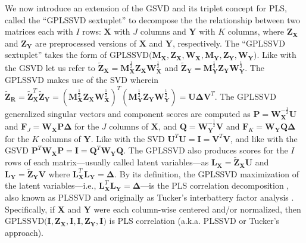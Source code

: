 \documentclass[12pt]{article}
\begin{document}
We now introduce an extension of the GSVD and its triplet concept for
PLS, called the ``GPLSSVD sextuplet'' to decompose the the relationship
between two matrices each with \(I\) rows: \({\mathbf X}\) with \(J\)
columns and \({\mathbf Y}\) with \(K\) columns, where
\({\mathbf Z}_{\mathbf X}\) and \({\mathbf Z}_{\mathbf Y}\) are
preprocessed versions of \({\mathbf X}\) and \({\mathbf Y}\),
respectively. The ``GPLSSVD sextuplet'' takes the form of
\(\mathrm{GPLSSVD(} {\mathbf M}_{\mathbf X}, {\mathbf Z}_{\mathbf X}, {\mathbf W}_{\mathbf X}, {\mathbf M}_{\mathbf Y}, {\mathbf Z}_{\mathbf Y}, {\mathbf W}_{\mathbf Y} \mathrm{)}\).
Like with the GSVD let us refer to
\(\widetilde{{\mathbf Z}}_{\mathbf X} = {\mathbf M}_{\mathbf X}^{\frac{1}{2}}{\mathbf Z}_{\mathbf X}{\mathbf W}_{\mathbf X}^{\frac{1}{2}}\)
and
\(\widetilde{{\mathbf Z}}_{\mathbf Y} = {\mathbf M}_{\mathbf Y}^{\frac{1}{2}}{\mathbf Z}_{\mathbf Y}{\mathbf W}_{\mathbf Y}^{\frac{1}{2}}\).
The GPLSSVD makes use of the SVD wherein
\(\widetilde{\mathbf Z}_{\mathbf R} = \widetilde{{\mathbf Z}}_{\mathbf X}^{T}\widetilde{{\mathbf Z}}_{\mathbf Y} = ({\mathbf M}_{\mathbf X}^{\frac{1}{2}}{\mathbf Z}_{\mathbf X}{\mathbf W}_{\mathbf X}^{\frac{1}{2}})^{T}({\mathbf M}_{\mathbf Y}^{\frac{1}{2}}{\mathbf Z}_{\mathbf Y}{\mathbf W}_{\mathbf Y}^{\frac{1}{2}}) = {\mathbf U} {\boldsymbol \Delta} {\mathbf V}^{T}\).
The GPLSSVD generalized singular vectors and component scores are
computed as
\({\mathbf P} = {\mathbf W}_{{\mathbf X}}^{-\frac{1}{2}}{\mathbf U}\)
and
\({\mathbf F}_{J} = {\mathbf W}_{{\mathbf X}}{\mathbf P}{\boldsymbol \Delta}\)
for the \(J\) columns of \({\mathbf X}\), and
\({\mathbf Q} = {\mathbf W}_{{\mathbf Y}}^{-\frac{1}{2}}{\mathbf V}\)
and
\({\mathbf F}_{K} = {\mathbf W}_{{\mathbf Y}}{\mathbf Q}{\boldsymbol \Delta}\)
for the \(K\) columns of \({\mathbf Y}\). Like with the SVD
\({\mathbf U}^{T}{\mathbf U} = {\mathbf I} = {\mathbf V}^{T}{\mathbf V}\),
and like with the GSVD
\({\mathbf P}^{T}{\mathbf W}_{\mathbf X}{\mathbf P} = {\mathbf I} = {\mathbf Q}^{T}{\mathbf W}_{\mathbf Y}{\mathbf Q}\).
The GPLSSVD also produces scores for the \(I\) rows of each
matrix---usually called latent variables---as
\({\mathbf L}_{\mathbf X} = \widetilde{\mathbf Z}_{\mathbf X}{\mathbf U}\)
and
\({\mathbf L}_{\mathbf Y} = \widetilde{\mathbf Z}_{\mathbf Y}{\mathbf V}\)
where
\({\mathbf L}_{\mathbf X}^{T} {\mathbf L}_{\mathbf Y} = {\boldsymbol \Delta}\).
By its definition, the GPLSSVD maximization of the latent
variables---i.e.,
\({\mathbf L}_{\mathbf X}^{T} {\mathbf L}_{\mathbf Y} = {\boldsymbol \Delta}\)---is
the PLS correlation decomposition
\citep{krishnan_partial_2011, bookstein1994partial, mcintosh_spatial_1996},
also known as PLSSVD \citep{tenenhaus_regression_1998} and originally as
Tucker's interbattery factor analysis \citep{tucker_inter-battery_1958}.
Specifically, if \({\mathbf X}\) and \({\mathbf Y}\) were each
column-wise centered and/or normalized, then
\(\mathrm{GPLSSVD(} {\mathbf I}, {\mathbf Z}_{\mathbf X}, {\mathbf I}, {\mathbf I}, {\mathbf Z}_{\mathbf Y}, {\mathbf I} \mathrm{)}\)
is PLS correlation (a.k.a. PLSSVD or Tucker's approach).
\end{document}
